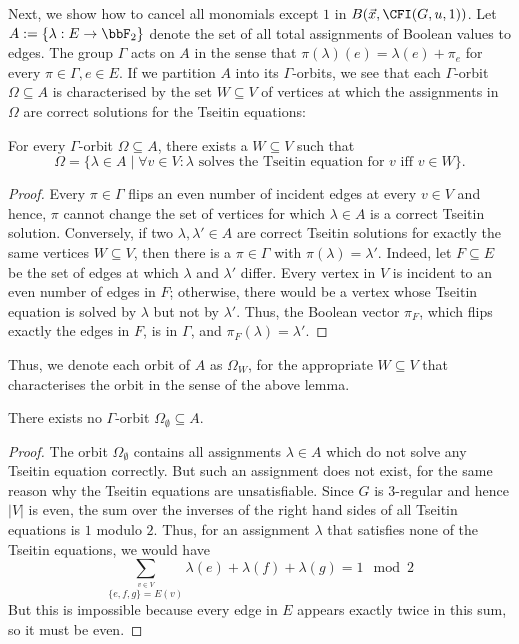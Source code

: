\documentclass[a4paper,UKenglish,cleveref, autoref, thm-restate]{lipics-v2021}
\begin{document}
Next, we show how to cancel all monomials except $1$ in $B(\vec x, \CFI(G,u,1))$. Let $A := \{ \lambda : E \to \bbF_2\}$ denote the set of all total assignments of Boolean values to edges. The group $\Gamma$ acts on $A$ in the sense that $\pi(\lambda)(e) = \lambda(e)+\pi_e$ for every $\pi \in \Gamma, e \in E$.
If we partition $A$ into its $\Gamma$-orbits, we see that each $\Gamma$-orbit $\Omega \subseteq A$ is characterised by the set $W \subseteq V$ of vertices at which the assignments in $\Omega$ are correct solutions for the Tseitin equations:
\begin{lemma}
	For every $\Gamma$-orbit $\Omega \subseteq A$, there exists a $W \subseteq V$ such that
	\[
	\Omega = \{ \lambda \in A \mid \forall v \in V: \lambda \text{ solves the Tseitin equation for } v \text{ iff } v \in W  \}.
	\]
\end{lemma}
\begin{proof}
	Every $\pi \in \Gamma$ flips an even number of incident edges at every $v \in V$ and hence, $\pi$ cannot change the set of vertices for which $\lambda \in A$ is a correct Tseitin solution. Conversely, if two $\lambda, \lambda' \in A$ 
	are correct Tseitin solutions for exactly the same vertices $W \subseteq V$, then there is a $\pi \in \Gamma$ with $\pi(\lambda) = \lambda'$. Indeed, let $F \subseteq E$ be the set of edges at which $\lambda$ and $\lambda'$ differ. Every vertex in $V$ is incident to an even number of edges in $F$; otherwise, there would be a vertex whose Tseitin equation is solved by $\lambda$ but not by $\lambda'$. Thus, the Boolean vector $\pi_F$, which flips exactly the edges in $F$, is in $\Gamma$, and $\pi_F(\lambda) = \lambda'$.
\end{proof}


Thus, we denote each orbit of $A$ as $\Omega_W$, for the appropriate $W \subseteq V$ that characterises the orbit in the sense of the above lemma.
\begin{lemma}
	\label{lem:noWisEmpty}
	There exists no $\Gamma$-orbit $\Omega_\emptyset \subseteq A$.
\end{lemma}	
\begin{proof}
	The orbit $\Omega_\emptyset$ contains all assignments $\lambda \in A$ which do not solve any Tseitin equation correctly. But such an assignment does not exist, for the same reason why the Tseitin equations are unsatisfiable. Since $G$ is $3$-regular and hence $|V|$ is even, the sum over the inverses of the right hand sides of all Tseitin equations is $1$ modulo $2$. Thus, for an assignment $\lambda$ that satisfies none of the Tseitin equations, we would have \[
	\sum_{\stackrel{v \in V}{\{e,f,g\} = E(v)}} \lambda(e) + \lambda(f) + \lambda(g) = 1 \mod 2
	\] But this is impossible because every edge in $E$ appears exactly twice in this sum, so it must be even.
\end{proof}	
\end{document}
